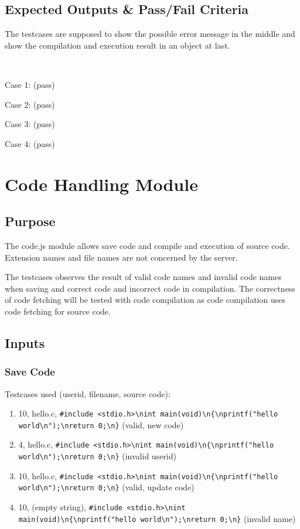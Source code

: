 \subsection{Expected Outputs \& Pass/Fail Criteria}
The testcases are supposed to show the possible error message in the middle and show the compilation and execution result in an object at last.

~

Case 1: (pass)


Case 2: (pass)


Case 3: (pass)


Case 4: (pass)


\section{Code Handling Module}
\subsection{Purpose}
The code.js module allows save code and compile and execution of source code. Extension names and file names are not concerned by the server.

The testcases observes the result of valid code names and invalid code names when saving and correct code and incorrect code in compilation. The correctness of code fetching will be tested with code compilation as code compilation uses code fetching for source code.

\subsection{Inputs}
\subsubsection{Save Code}
Testcases used (userid, filename, source code):
\begin{enumerate}
  \item 10, hello.c, \verb|#include <stdio.h>\nint main(void)\n{\nprintf("hello world\n");\nreturn 0;\n}| (valid, new code)
  \item 4, hello.c, \verb|#include <stdio.h>\nint main(void)\n{\nprintf("hello world\n");\nreturn 0;\n}| (invalid userid)
  \item 10, hello.c, \verb|#include <stdio.h>\nint main(void)\n{\nprintf("hello world\n");\nreturn 0;\n}| (valid, update code)
  \item 10, (empty string), \verb|#include <stdio.h>\nint main(void)\n{\nprintf("hello world\n");\nreturn 0;\n}| (invalid name)
\end{enumerate}

